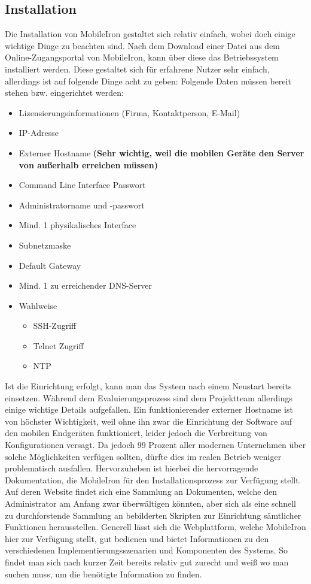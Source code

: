 \subsection{Installation}
Die Installation von MobileIron gestaltet sich relativ einfach, wobei doch einige wichtige Dinge zu beachten sind. Nach dem Download einer Datei aus dem Online-Zugangsportal von MobileIron, kann über diese das Betriebssystem installiert werden. Diese gestaltet sich für erfahrene Nutzer sehr einfach, allerdings ist auf folgende Dinge acht zu geben: \newline
Folgende Daten müssen bereit stehen bzw. eingerichtet werden:
\begin{itemize}
	\item Lizensierungsinformationen (Firma, Kontaktperson, E-Mail)
	\item IP-Adresse
	\item Externer Hostname \textbf{(Sehr wichtig, weil die mobilen Geräte den Server von außerhalb erreichen müssen)}
	\item Command Line Interface Passwort
	\item Administratorname und -passwort
	\item Mind. 1 physikalisches Interface
	\item Subnetzmaske
	\item Default Gateway
	\item Mind. 1 zu erreichender DNS-Server
	\item Wahlweise
	\begin{itemize}
		\item SSH-Zugriff
		\item Telnet Zugriff
		\item NTP
	\end{itemize}
\end{itemize}
Ist die Einrichtung erfolgt, kann man das System nach einem Neustart bereits einsetzen. Während dem Evaluierungsprozess sind dem Projektteam allerdings einige wichtige Details aufgefallen. Ein funktionierender externer Hostname ist von höchster Wichtigkeit, weil ohne ihn zwar die Einrichtung der Software auf den mobilen Endgeräten funktioniert, leider jedoch die Verbreitung von Konfigurationen versagt. Da jedoch 99 Prozent aller modernen Unternehmen über solche Möglichkeiten verfügen sollten, dürfte dies im realen Betrieb weniger problematisch ausfallen. Hervorzuheben ist hierbei die hervorragende Dokumentation, die MobileIron für den Installationsprozess zur Verfügung stellt. Auf deren Website findet sich eine Sammlung an Dokumenten, welche den Administrator am Anfang zwar überwältigen könnten, aber sich als eine schnell zu durchforstende Sammlung an bebilderten Skripten zur Einrichtung sämtlicher Funktionen herausstellen. Generell lässt sich die Webplattform, welche MobileIron hier zur Verfügung stellt, gut bedienen und bietet Informationen zu den verschiedenen Implementierungsszenarien und Komponenten des Systems. So findet man sich nach kurzer Zeit bereits relativ gut zurecht und weiß wo man suchen muss, um die benötigte Information zu finden.